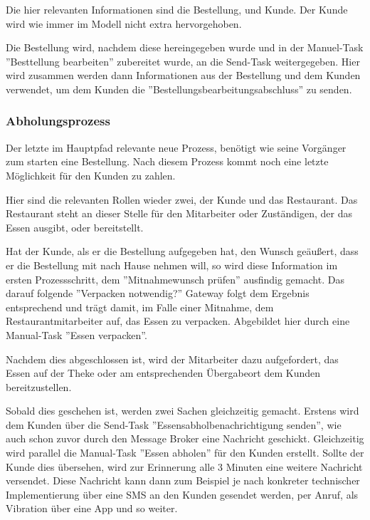 Die hier relevanten Informationen sind die Bestellung, und Kunde. Der Kunde wird wie immer im Modell nicht extra hervorgehoben. 

Die Bestellung wird, nachdem diese hereingegeben wurde und in der Manuel-Task ''Besttellung bearbeiten'' zubereitet wurde, an die Send-Task weitergegeben. Hier wird zusammen werden dann Informationen aus der Bestellung und dem Kunden verwendet, um dem Kunden die ''Bestellungsbearbeitungsabschluss'' zu senden.

\subsubsection{Abholungsprozess}
Der letzte im Hauptpfad relevante neue Prozess, benötigt wie seine Vorgänger zum starten eine Bestellung. Nach diesem Prozess kommt noch eine letzte Möglichkeit für den Kunden zu zahlen.


Hier sind die relevanten Rollen wieder zwei, der Kunde und das Restaurant. Das Restaurant steht an dieser Stelle für den Mitarbeiter oder Zuständigen, der das Essen ausgibt, oder bereitstellt.

\clearpage
{}


Hat der Kunde, als er die Bestellung aufgegeben hat, den Wunsch geäußert, dass er die Bestellung mit nach Hause nehmen will, so wird diese Information im ersten Prozessschritt, dem ''Mitnahmewunsch prüfen'' ausfindig gemacht. Das darauf folgende ''Verpacken notwendig?'' Gateway folgt dem Ergebnis entsprechend und trägt damit, im Falle einer Mitnahme, dem Restaurantmitarbeiter auf, das Essen zu verpacken. Abgebildet hier durch eine Manual-Task ''Essen verpacken''.

Nachdem dies abgeschlossen ist, wird der Mitarbeiter dazu aufgefordert, das Essen auf der Theke oder am entsprechenden Übergabeort dem Kunden bereitzustellen.

Sobald dies geschehen ist, werden zwei Sachen gleichzeitig gemacht. Erstens wird dem Kunden über die Send-Task ''Essensabholbenachrichtigung senden'', wie auch schon zuvor durch den Message Broker eine Nachricht geschickt. Gleichzeitig wird parallel die Manual-Task ''Essen abholen'' für den Kunden erstellt. Sollte der Kunde dies übersehen, wird zur Erinnerung alle 3 Minuten eine weitere Nachricht versendet. Diese Nachricht kann dann zum Beispiel je nach konkreter technischer Implementierung über eine SMS an den Kunden gesendet werden, per Anruf, als Vibration über eine App und so weiter.

